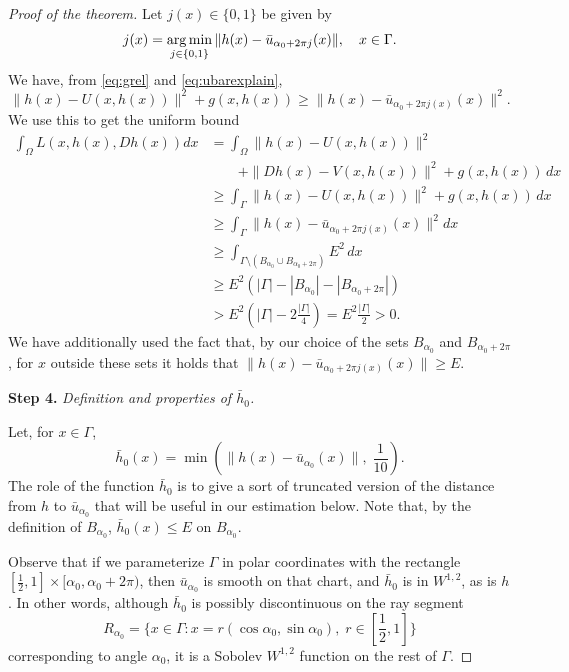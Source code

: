 \documentclass{article}
\theoremstyle{definition}
\theoremstyle{remark}
\newcommand{\denomxi}{10}
\newcommand{\uu}{u}
\begin{document}
\begin{proof}[Proof of the theorem]
Let $j(x)\in \{0,1\}$ be given by%
\[j(x)=\operatornamewithlimits{arg\,min}_{j\in\{0,1\}}\|h(x)-\bar \uu_{{\alpha_0}+2\pi j}(x)\|,\quad x\in\Gamma. \]
We have, from \eqref{eq:grel} and \eqref{eq:ubarexplain},
\[\|h(x)-U(x,h(x))\|^2+g(x,h(x))\geq \|h(x)-\bar \uu_{{\alpha_0} + 2\pi j(x)}(x)\|^2.\]
We use this to get the uniform bound 
\begin{align*}
 \int_\Omega L(x,h(x),Dh(x))dx
 &=\int_\Omega \|h(x)-U(x,h(x))\|^2\\
 &\qquad +\|Dh(x)-V(x,h(x))\|^2+g(x,h(x))\,dx\\
 &\geq\int_\Gamma \|h(x)-U(x,h(x))\|^2+g(x,h(x))\,dx\\
 &\geq \int_\Gamma \|h(x)-\bar \uu_{{\alpha_0} + 2\pi j(x)}(x)\|^2dx\\
 &\geq \int_{\Gamma\setminus(B_{\alpha_0}\cup B_{\alpha_0+2\pi})}E^2\,dx\\
 &\geq  E^2(|\Gamma|-|B_{\alpha_0}|-|B_{{\alpha_0}+2\pi}|)\\
%
 &>  E^2\left(|\Gamma|-2\frac{|\Gamma|}4\right)=E^2\frac{|\Gamma|}{2}>0.
\end{align*}
We have additionally used the fact that, by our choice of the sets $B_{\alpha_0}$ and $B_{\alpha_0+2\pi}$, for $x$ outside these sets it holds that $\|h(x)-\bar \uu_{\alpha_0+2\pi j(x)}(x)\|\geq E$.
 
\noindent\textbf{Step 4.} \emph{Definition and properties of $\bar h_0$.}

Let,  for $x\in\Gamma$,
\[\bar h_0(x)=\min\left(\|h(x)-\bar \uu_{{\alpha_0}}(x)\|,\;\frac1{\denomxi}\right).
\]
The role of the function $\bar h_0$ is to give a sort of truncated version of the distance from $h$ to $\bar \uu_{{\alpha_0}}$ that will be useful in our estimation below.
Note that, by the definition of $B_{\alpha_0}$, $\bar h_0(x)\leq E$ on $B_{\alpha_0}$.

Observe that if we parameterize $\Gamma$ in polar coordinates with the rectangle $[\frac12, 1]\times [\alpha_0,\alpha_0+2\pi)$, then $\bar \uu_{\alpha_0}$ is smooth on that chart, and $\bar h_0$ is in $W^{1,2}$, as is $h$. In other words, although $\bar h_0$ is possibly discontinuous on the ray segment 
\[R_{\alpha_0}=\{x\in \Gamma:x=r(\cos{\alpha_0},\sin{\alpha_0}), \;r\in[\frac12,1]\}\] 
corresponding to angle $\alpha_0$, it is a Sobolev $W^{1,2}$ function on the rest of $\Gamma$.


\end{proof}
\end{document}
